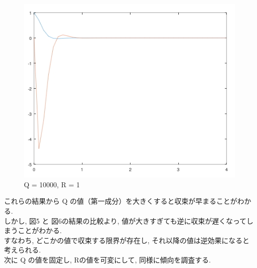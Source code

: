 \documentclass{jsarticle}
\begin{document}
\begin{figure}[h!]
\begin{minipage}{0.325\linewidth}
    \centering
    \includegraphics[width=\linewidth]{./fig/q10000_r1.png}
    \caption{Q = 10000, R = 1}
  \end{minipage}
\end{figure}

これらの結果から Q の値（第一成分）を大きくすると収束が早まることがわかる.\\
\hspace*{1zw}しかし, 図5 と 図6の結果の比較より, 値が大きすぎても逆に収束が遅くなってしまうことがわかる.\\
\hspace*{1zw}すなわち, どこかの値で収束する限界が存在し, それ以降の値は逆効果になると考えられる.\\

\vspace*{-6mm}次に Q の値を固定し, Rの値を可変にして, 同様に傾向を調査する.
\end{document}
